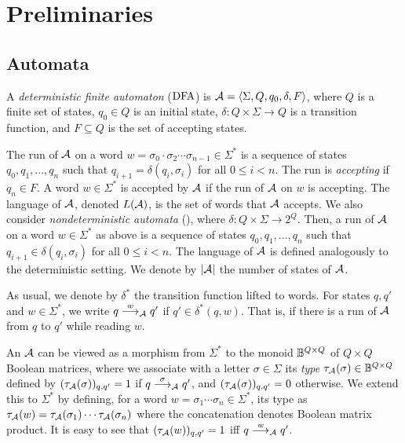 \chapter{Preliminaries}
\label{chap:prelims}

\section*{Automata}
A \emph{deterministic finite automaton} ($\mbox{\rm DFA}$) is $\mathcal{A}=\left< \Sigma,Q,q_0,\delta,F\right>$, where $Q$ is a finite set of states, $q_0 \in Q$ is an initial state, $\delta: Q\times \Sigma \to Q$ is a transition function, and $F\subseteq Q$ is the set of accepting states. 

The run of $\mathcal{A}$ on a word $w=\sigma_0 \cdot \sigma_2 \cdots \sigma_{n-1}\in \Sigma^*$ is a sequence of states $q_0,q_1,\ldots,q_n$ such that $q_{i+1} = \delta(q_i,\sigma_{i})$ for all $0\le i<n$. 
The run is \emph{accepting} if $q_n\in F$. A word $w \in \Sigma^*$ is accepted by $\mathcal{A}$ if the run of $\mathcal{A}$ on $w$ is accepting. The language of $\mathcal{A}$, denoted $L(\mathcal{A})$, is the set of words that $\mathcal{A}$ accepts. 
We also consider \emph{nondeterministic automata} (\NFA), where $\delta:Q\times \Sigma\to 2^Q$. Then, a run of $\mathcal{A}$ on a word $w\in \Sigma^*$ as above is a sequence of states $q_0,q_1,\ldots,q_n$ such that $q_{i+1} \in \delta(q_i,\sigma_{i})$ for all $0\le i<n$. The language of $\mathcal{A}$ is defined analogously to the deterministic setting.
We denote by $|\mathcal{A}|$ the number of states of $\mathcal{A}$.

As usual, we denote by $\delta^*$ the transition function lifted to words.
For states $q,q'$ and $w\in \Sigma^*$, we write $q\stackrel{w}{\longrightarrow}_{\mathcal{A}}q'$ if $q'\in \delta^*(q,w)$. That is, if there is a run of $\mathcal{A}$ from $q$ to $q'$ while reading $w$.

An \NFA $\mathcal{A}$ can be viewed as a morphism from $\Sigma^*$ to the monoid $\mathbb{B}^{Q\times Q}$ of $Q\times Q$ Boolean matrices, where we associate with a letter $\sigma\in \Sigma$ its \emph{type} $\tau_{\mathcal{A}}(\sigma)\in \mathbb{B}^{Q\times Q}$ defined by $(\tau_{\mathcal{A}}(\sigma))_{q,q'}=1$ if $q\stackrel{\sigma}{\longrightarrow}_{\mathcal{A}}q'$, and $(\tau_{\mathcal{A}}(\sigma))_{q,q'}=0$ otherwise. We extend this to $\Sigma^*$ by defining, for a word $w=\sigma_1\cdots \sigma_n\in \Sigma^*$, its type as $\tau_{\mathcal{A}}(w)=\tau_{\mathcal{A}}(\sigma_1)\cdots \tau_{\mathcal{A}}(\sigma_n)$ where the concatenation denotes Boolean matrix product. It is easy to see that $(\tau_{\mathcal{A}}(w))_{q,q'}=1$ iff $q\stackrel{w}{\longrightarrow}_{\mathcal{A}}q'$.

